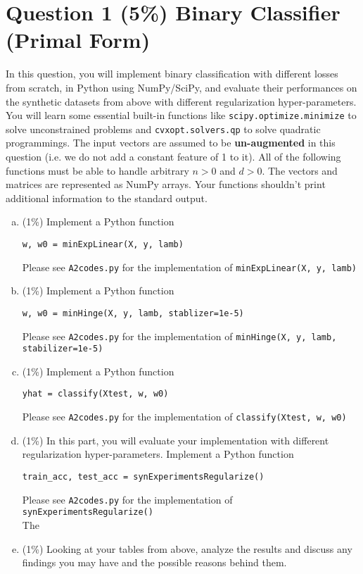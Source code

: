 \documentclass[12pt]{article}
\newcounter{ques}
\begin{document}
\section*{Question 1 (5\%) Binary Classifier (Primal Form)}
In this question, you will implement binary classification with different losses from scratch, in Python using NumPy/SciPy, and evaluate their performances on the synthetic datasets from above with different regularization hyper-parameters. You will learn some essential built-in functions like \texttt{scipy.optimize.minimize} to solve unconstrained problems and \texttt{cvxopt.solvers.qp} to solve quadratic programmings.
The input vectors are assumed to be \textbf{un-augmented} in this question (i.e. we do not add a constant feature of 1 to it). All of the following functions must be able to handle arbitrary $n > 0$ and $d > 0$. The vectors and matrices are represented as NumPy arrays. Your functions shouldn't print additional information to the
standard output.
\begin{enumerate}[(a)]
  \item (1\%) Implement a Python function 
    \begin{center}
      \texttt{w, w0 = minExpLinear(X, y, lamb)}
    \end{center}
    Please see \texttt{A2codes.py} for the implementation of \texttt{minExpLinear(X, y, lamb)}
  \item (1\%) Implement a Python function
    \begin{center}
      \texttt{w, w0 = minHinge(X, y, lamb, stablizer=1e-5)}
    \end{center}
    Please see \texttt{A2codes.py} for the implementation of \texttt{minHinge(X, y, lamb, stabilizer=1e-5)}
  \item (1\%) Implement a Python function 
    \begin{center}
      \texttt{yhat = classify(Xtest, w, w0)}\\
    \end{center}
    Please see \texttt{A2codes.py} for the implementation of \texttt{classify(Xtest, w, w0)}
  \item (1\%) In this part, you will evaluate your implementation with different regularization hyper-parameters. Implement a Python function 
    \begin{center}
      \texttt{train\_acc, test\_acc = synExperimentsRegularize()}
    \end{center}
    Please see \texttt{A2codes.py} for the implementation of \texttt{synExperimentsRegularize()} \\
    The 
  \item (1\%) Looking at your tables from above, analyze the results and discuss any findings you may have and the possible reasons behind them.
\end{enumerate}
\end{document}
